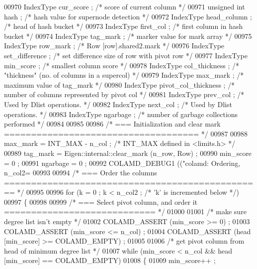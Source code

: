 \begin{DoxyCode}
{{{{{{{{{{{{{{{{{00970   IndexType cur\_score ;   \textcolor{comment}{/* score of current column */}
00971   \textcolor{keywordtype}{unsigned} \textcolor{keywordtype}{int} hash ;   \textcolor{comment}{/* hash value for supernode detection */}
00972   IndexType head\_column ;   \textcolor{comment}{/* head of hash bucket */}
00973   IndexType first\_col ;   \textcolor{comment}{/* first column in hash bucket */}
00974   IndexType tag\_mark ;    \textcolor{comment}{/* marker value for mark array */}
00975   IndexType row\_mark ;    \textcolor{comment}{/* Row [row].shared2.mark */}
00976   IndexType set\_difference ;  \textcolor{comment}{/* set difference size of row with pivot row */}
00977   IndexType min\_score ;   \textcolor{comment}{/* smallest column score */}
00978   IndexType col\_thickness ;   \textcolor{comment}{/* "thickness" (no. of columns in a supercol) */}
00979   IndexType max\_mark ;    \textcolor{comment}{/* maximum value of tag\_mark */}
00980   IndexType pivot\_col\_thickness ; \textcolor{comment}{/* number of columns represented by pivot col */}
00981   IndexType prev\_col ;    \textcolor{comment}{/* Used by Dlist operations. */}
00982   IndexType next\_col ;    \textcolor{comment}{/* Used by Dlist operations. */}
00983   IndexType ngarbage ;    \textcolor{comment}{/* number of garbage collections performed */}
00984 
00985 
00986   \textcolor{comment}{/* === Initialization and clear mark ==================================== */}
00987 
00988   max\_mark = INT\_MAX - n\_col ;  \textcolor{comment}{/* INT\_MAX defined in <limits.h> */}
00989   tag\_mark = Eigen::internal::clear\_mark (n\_row, Row) ;
00990   min\_score = 0 ;
00991   ngarbage = 0 ;
00992   COLAMD\_DEBUG1 ((\textcolor{stringliteral}{"colamd: Ordering, n\_col2=%
00993 
00994   \textcolor{comment}{/* === Order the columns ================================================ */}
00995 
00996   \textcolor{keywordflow}{for} (k = 0 ; k < n\_col2 ; \textcolor{comment}{/* 'k' is incremented below */})
00997   \{
00998 
00999     \textcolor{comment}{/* === Select pivot column, and order it ============================ */}
01000 
01001     \textcolor{comment}{/* make sure degree list isn't empty */}
01002     COLAMD\_ASSERT (min\_score >= 0) ;
01003     COLAMD\_ASSERT (min\_score <= n\_col) ;
01004     COLAMD\_ASSERT (head [min\_score] >= COLAMD\_EMPTY) ;
01005 
01006     \textcolor{comment}{/* get pivot column from head of minimum degree list */}
01007     \textcolor{keywordflow}{while} (min\_score < n\_col && head [min\_score] == COLAMD\_EMPTY)
01008     \{
01009       min\_score++ ;
}}}}}}}}}}}}}}}}}}
\end{DoxyCode}
